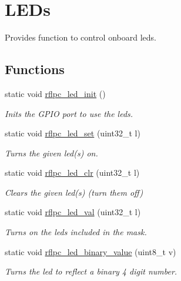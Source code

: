 \hypertarget{group__leds}{\section{L\-E\-Ds}
\label{group__leds}
}


Provides function to control onboard leds.  


\subsection*{Functions}
\begin{DoxyCompactItemize}
\item 
static void \hyperlink{group__leds_ga54d1ee893a6db34dc26cc9a5f883a9fd}{rflpc\-\_\-led\-\_\-init} ()
\begin{DoxyCompactList}\small\item\em Inits the G\-P\-I\-O port to use the leds. \end{DoxyCompactList}\item 
\hypertarget{group__leds_gafb8c1c4db400ec6b9fb6c806d680bd5c}{static void \hyperlink{group__leds_gafb8c1c4db400ec6b9fb6c806d680bd5c}{rflpc\-\_\-led\-\_\-set} (uint32\-\_\-t l)}\label{group__leds_gafb8c1c4db400ec6b9fb6c806d680bd5c}

\begin{DoxyCompactList}\small\item\em Turns the given led(s) on. \end{DoxyCompactList}\item 
\hypertarget{group__leds_gaba00c254fae4ab263eec79695997b08d}{static void \hyperlink{group__leds_gaba00c254fae4ab263eec79695997b08d}{rflpc\-\_\-led\-\_\-clr} (uint32\-\_\-t l)}\label{group__leds_gaba00c254fae4ab263eec79695997b08d}

\begin{DoxyCompactList}\small\item\em Clears the given led(s) (turn them off) \end{DoxyCompactList}\item 
\hypertarget{group__leds_ga11f48c32339fff3ca9eeb88ce7d45c39}{static void \hyperlink{group__leds_ga11f48c32339fff3ca9eeb88ce7d45c39}{rflpc\-\_\-led\-\_\-val} (uint32\-\_\-t l)}\label{group__leds_ga11f48c32339fff3ca9eeb88ce7d45c39}

\begin{DoxyCompactList}\small\item\em Turns on the leds included in the mask. \end{DoxyCompactList}\item 
static void \hyperlink{group__leds_gaa3bf1f9f8b952db4d47f0c62f15a1bbb}{rflpc\-\_\-led\-\_\-binary\-\_\-value} (uint8\-\_\-t v)
\begin{DoxyCompactList}\small\item\em Turns the led to reflect a binary 4 digit number. \end{DoxyCompactList}\end{DoxyCompactItemize}

